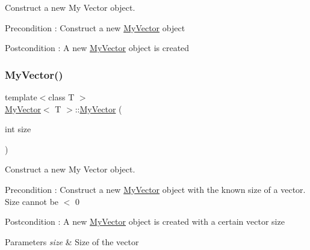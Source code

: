 Construct a new My Vector object. 

\begin{DoxyPrecond}{Precondition}
\+: Construct a new \mbox{\hyperlink{class_my_vector}{My\+Vector}} object 
\end{DoxyPrecond}
\begin{DoxyPostcond}{Postcondition}
\+: A new \mbox{\hyperlink{class_my_vector}{My\+Vector}} object is created 
\end{DoxyPostcond}
\mbox{\label{class_my_vector_a9f780e2c6c6f35610a656b64395c6d1b}} 
\subsubsection{\texorpdfstring{MyVector()}{MyVector()}\hspace{0.1cm}{\footnotesize\ttfamily [2/4]}}
{\footnotesize\ttfamily template$<$class T $>$ \\
\mbox{\hyperlink{class_my_vector}{My\+Vector}}$<$ T $>$\+::\mbox{\hyperlink{class_my_vector}{My\+Vector}} (\begin{DoxyParamCaption}\item[{int}]{size }\end{DoxyParamCaption})}



Construct a new My Vector object. 

\begin{DoxyPrecond}{Precondition}
\+: Construct a new \mbox{\hyperlink{class_my_vector}{My\+Vector}} object with the known size of a vector. Size cannot be $<$ 0 
\end{DoxyPrecond}
\begin{DoxyPostcond}{Postcondition}
\+: A new \mbox{\hyperlink{class_my_vector}{My\+Vector}} object is created with a certain vector size 
\end{DoxyPostcond}

\begin{DoxyParams}{Parameters}
{\em size} & Size of the vector \\
\hline
\end{DoxyParams}
\mbox{\label{class_my_vector_aaf93995f4a267cc279867c10cfbef623}} 
